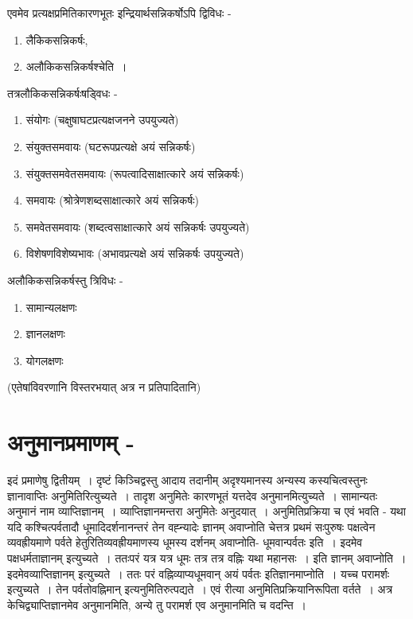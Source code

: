 {एवमेव प्रत्यक्षप्रमितिकारणभूतः इन्द्रियार्थसन्निकर्षोऽपि द्विविधः -
\begin{enumerate}
\itemsep=0pt
\item लैकिकसन्निकर्षः,
\item अलौकिकसन्निकर्षश्चेति~। 
\end{enumerate}
तत्रलौकिकसन्निकर्षःषड्विधः -
\begin{enumerate}
\itemsep=0pt
\item संयोगः (चक्षुषाघटप्रत्यक्षजनने उपयुज्यते)
\item	संयुक्तसमवायः (घटरूपप्रत्यक्षे अयं सन्निकर्षः)
\item	संयुक्तसमवेतसमवायः (रूपत्वादिसाक्षात्कारे अयं सन्निकर्षः)
\item 	समवायः (श्रोत्रेणशब्दसाक्षात्कारे अयं सन्निकर्षः)
\item 	समवेतसमवायः (शब्दत्वसाक्षात्कारे अयं सन्निकर्षः उपयुज्यते)
\item 	विशेषणविशेष्यभावः (अभावप्रत्यक्षे अयं सन्निकर्षः उपयुज्यते)
\end{enumerate}
अलौकिकसन्निकर्षस्तु त्रिविधः -
\begin{enumerate}
\itemsep=0pt
\item सामान्यलक्षणः
\item ज्ञानलक्षणः
\item योगलक्षणः
\end{enumerate}
(एतेषांविवरणानि विस्तरभयात् अत्र न प्रतिपादितानि)

\section*{अनुमानप्रमाणम् -}

इदं प्रमाणेषु द्वितीयम्~। दृष्टं किञ्चिद्वस्तु आदाय तदानीम् अदृश्यमानस्य अन्यस्य कस्यचित्वस्तुनः ज्ञानावाप्तिः अनुमितिरित्युच्यते~। तादृश अनुमितेः कारणभूतं यत्तदेव अनुमानमित्युच्यते~। सामान्यतः अनुमानं नाम व्याप्तिज्ञानम्~। व्याप्तिज्ञानमन्तरा अनुमितेः अनुदयात्~। अनुमितिप्रक्रिया च एवं भवति - यथा यदि कश्चित्पर्वतादौ धूमादिदर्शनानन्तरं तेन वह्न्यादेः ज्ञानम् अवाप्नोति चेत्तत्र प्रथमं सःपुरुषः पक्षत्वेन व्यवह्रीयमाणे पर्वते हेतुरितिव्यवह्रीयमाणस्य धूमस्य दर्शनम् अवाप्नोति- धूमवान्पर्वतः इति~। इदमेव पक्षधर्मताज्ञानम् इत्युच्यते~। ततःपरं यत्र यत्र धूमः तत्र तत्र वह्निः यथा महानसः~। इति ज्ञानम् अवाप्नोति~। इदमेवव्याप्तिज्ञानम् इत्युच्यते~। ततः परं वह्निव्याप्यधूमवान् अयं पर्वतः इतिज्ञानमाप्नोति~। यच्च परामर्शः इत्युच्यते~। तेन पर्वतोवह्निमान् इत्यनुमितिरुत्पद्यते~। एवं रीत्या अनुमितिप्रक्रियानिरूपिता वर्तते~। अत्र केचिद्व्याप्तिज्ञानमेव अनुमानमिति, अन्ये तु परामर्श एव अनुमानमिति च वदन्ति~। 

}
